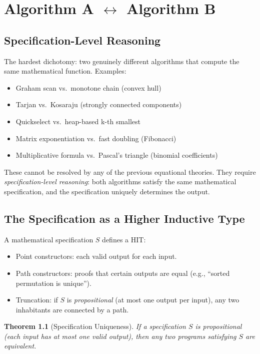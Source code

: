 \documentclass[11pt,a4paper]{report}
\theoremstyle{definition}
\theoremstyle{plain}
\newtheorem{theorem}[definition]{Theorem}
\begin{document}
\chapter{Algorithm A $\leftrightarrow$ Algorithm B}
\label{ch:algo-algo}

\section{Specification-Level Reasoning}

The hardest dichotomy: two genuinely different algorithms that compute
the same mathematical function.  Examples:
\begin{itemize}
  \item Graham scan vs.\ monotone chain (convex hull)
  \item Tarjan vs.\ Kosaraju (strongly connected components)
  \item Quickselect vs.\ heap-based k-th smallest
  \item Matrix exponentiation vs.\ fast doubling (Fibonacci)
  \item Multiplicative formula vs.\ Pascal's triangle (binomial
    coefficients)
\end{itemize}

These cannot be resolved by any of the previous equational theories.
They require \emph{specification-level reasoning}: both algorithms
satisfy the same mathematical specification, and the specification
uniquely determines the output.

\section{The Specification as a Higher Inductive Type}

A mathematical specification $S$ defines a HIT:
\begin{itemize}
  \item Point constructors: each valid output for each input.
  \item Path constructors: proofs that certain outputs are equal
    (e.g., ``sorted permutation is unique'').
  \item Truncation: if $S$ is \emph{propositional} (at most one
    output per input), any two inhabitants are connected by a path.
\end{itemize}

\begin{theorem}[Specification Uniqueness]
If a specification $S$ is propositional (each input has at most one
valid output), then any two programs satisfying $S$ are equivalent.
\end{theorem}
\end{document}

